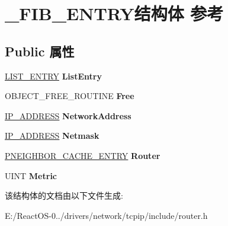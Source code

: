 \hypertarget{struct___f_i_b___e_n_t_r_y}{}\section{\+\_\+\+F\+I\+B\+\_\+\+E\+N\+T\+R\+Y结构体 参考}
\label{struct___f_i_b___e_n_t_r_y}
\subsection*{Public 属性}
\begin{DoxyCompactItemize}
\item 
\mbox{\label{struct___f_i_b___e_n_t_r_y_a09c38f949fc40a17509993237ba240a3}} 
\hyperlink{struct___l_i_s_t___e_n_t_r_y}{L\+I\+S\+T\+\_\+\+E\+N\+T\+RY} {\bfseries List\+Entry}
\item 
\mbox{\label{struct___f_i_b___e_n_t_r_y_ae7940ad9ff06bccc7e786f55074525b5}} 
O\+B\+J\+E\+C\+T\+\_\+\+F\+R\+E\+E\+\_\+\+R\+O\+U\+T\+I\+NE {\bfseries Free}
\item 
\mbox{\label{struct___f_i_b___e_n_t_r_y_ab9e436e58c01f3707c6bec87499feb65}} 
\hyperlink{struct_i_p___a_d_d_r_e_s_s}{I\+P\+\_\+\+A\+D\+D\+R\+E\+SS} {\bfseries Network\+Address}
\item 
\mbox{\label{struct___f_i_b___e_n_t_r_y_a7b2f4467f3bc5a5a61d10f42835221da}} 
\hyperlink{struct_i_p___a_d_d_r_e_s_s}{I\+P\+\_\+\+A\+D\+D\+R\+E\+SS} {\bfseries Netmask}
\item 
\mbox{\label{struct___f_i_b___e_n_t_r_y_a066dd10b885eee1b7ad605f9a6531da9}} 
\hyperlink{struct_n_e_i_g_h_b_o_r___c_a_c_h_e___e_n_t_r_y}{P\+N\+E\+I\+G\+H\+B\+O\+R\+\_\+\+C\+A\+C\+H\+E\+\_\+\+E\+N\+T\+RY} {\bfseries Router}
\item 
\mbox{\label{struct___f_i_b___e_n_t_r_y_a5106ef214593037c446b69f285f25897}} 
U\+I\+NT {\bfseries Metric}
\end{DoxyCompactItemize}


该结构体的文档由以下文件生成\+:\begin{DoxyCompactItemize}
\item 
E\+:/\+React\+O\+S-\/0../drivers/network/tcpip/include/router.\+h\end{DoxyCompactItemize}
